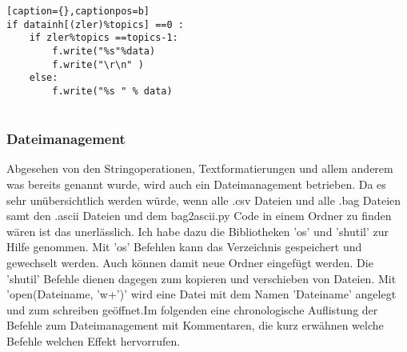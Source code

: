 \documentclass[11pt]{scrartcl}
\begin{document}
\begin{onehalfspace}
\begin{lstlisting}[basicstyle=\small][caption={},captionpos=b]
if datainh[(zler)%topics] ==0 :
	if zler%topics ==topics-1:
		f.write("%s"%data)
		f.write("\r\n" )
	else:
		f.write("%s	" % data)
						
\end{lstlisting}

\subsubsection{Dateimanagement }

Abgesehen von den Stringoperationen, Textformatierungen und allem anderem was bereits genannt wurde, wird auch ein Dateimanagement betrieben. Da es sehr unübersichtlich werden würde, wenn alle .csv Dateien und alle .bag Dateien samt den .ascii Dateien und dem bag2ascii.py Code in einem Ordner zu finden wären ist das unerlässlich. Ich habe dazu die Bibliotheken 'os' und 'shutil' zur Hilfe genommen. Mit 'os' Befehlen kann das Verzeichnis gespeichert und gewechselt werden. Auch können damit neue Ordner eingefügt werden. Die 'shutil' Befehle dienen dagegen zum kopieren und verschieben von Dateien. Mit 'open(Dateiname, 'w+')' wird eine Datei mit dem Namen 'Dateiname' angelegt und zum schreiben geöffnet.Im folgenden eine chronologische Auflistung der Befehle zum Dateimanagement mit Kommentaren, die kurz erwähnen welche Befehle welchen Effekt hervorrufen.


\end{onehalfspace}
\end{document}
